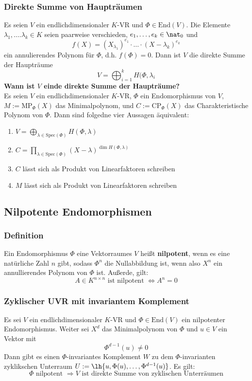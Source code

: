 \documentclass{kit}
\begin{document}
    \subsubsection{Direkte Summe von Haupträumen}
      Es seien $V$ ein endlichdimensionaler $K$-VR und $\Phi\in\text{End}(V)$. Die Elemente $\lambda_1,\dots.\lambda_k\in K$
      seien paarweise verschieden, $e_1,\dots,e_k\in\nat_0$ und
      $$f(X)=(X_{\lambda_1})^{e_1}\cdot\dots\cdot(X-\lambda_k)^{e_k}$$
      ein annulierendes Polynom für $\Phi$, d.h. $f(\Phi)=0$. Dann ist $V$ die direkte Summe der Haupträume
      $$V=\bigoplus_{i=1}^kH(\Phi,\lambda_i$$
      \textbf{Wann ist $V$ einde direkte Summe der Haupträume?}\\
      Es seien $V$ ein endlichdimensionaler $K$-VR, $\Phi$ ein Endomorphismus von $V$, $M:=\text{MP}_\Phi(X)$ das 
      Minimalpolynom, und $C:=\text{CP}_\Phi(X)$ das Charakteristische Polynom von $\Phi$. Dann sind folgedne vier Aussagen
      äquivalent:
      \begin{enumerate}[label=\roman*)]
        \item $V=\bigoplus_{\lambda\in\text{Spec}(\Phi)}H(\Phi,\lambda)$
        \item $C=\prod_{\lambda\in\text{Spec}(\Phi)}(X-\lambda)^{\dim H(\Phi,\lambda)}$
        \item $C$ lässt sich als Produkt von Linearfaktoren schreiben
        \item $M$ lässt sich als Produkt von Linearfaktoren schreiben
      \end{enumerate}
  \subsection{Nilpotente Endomorphismen}
    \subsubsection{Definition}
      Ein Endomorphismus $\Phi$ eine Vektorraumes $V$ heißt \textbf{nilpotent}, wenn es eine natürliche Zahl $n$ gibt, 
      sodass $\Phi^n$ die Nullabbildung ist, wenn also $X^n$ ein annullierendes Polynom von $\Phi$ ist. Außerde, gilt:
      $$A\in K^{n\times n}\text{ ist nilpotent }\Longleftrightarrow A^n=0$$
    \subsubsection{Zyklischer UVR mit invariantem Komplement}
      Es sei $V$ ein endlichdimensionaler $K$-VR und $\Phi\in\text{End}(V)$ ein nilpotenter Endomorphismus. Weiter sei
      $X^d$ das Minimalpolynom von $\Phi$ und $u\in V$ ein Vektor mit
      $$\Phi^{d-1}(u)\neq0$$
      Dann gibt es einen $\Phi$-invariantes Komplement $W$ zu dem $\Phi$-invarianten zyklikschen Unterraum 
      $U:=\lh{u,\Phi(u),\dots,\Phi^{d-1}(u)}$. Es gilt:
      $$\Phi\text{ nilpotent }\Rightarrow V\text{ ist direkte Summe von zyklischen Unterräumen}$$
\end{document}
